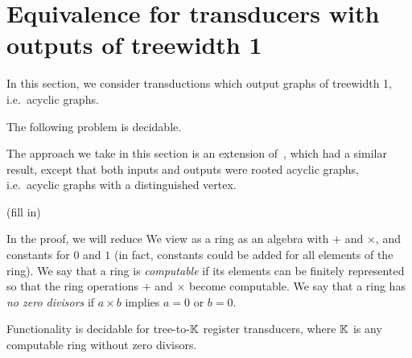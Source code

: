 
\section{Equivalence for transducers with outputs of treewidth 1}
In this section, we consider transductions which output graphs of treewidth 1, i.e.~acyclic graphs. 

\begin{theorem} The following problem is decidable.
\end{theorem}

The approach we take in this section is an extension of~\cite[Section 3.3]{boiretReducingTransducerEquivalence2018}, which had a similar result, except that both inputs and outputs were rooted acyclic graphs, i.e.~acyclic graphs with a distinguished vertex. 

\begin{center}
    (fill in)
\end{center}

In the proof, we will reduce 
We view as a ring as an algebra with $+$ and $\times$, and constants for $0$ and $1$ (in fact, constants could be added for all elements of the ring). We say that a ring is \emph{computable} if its elements can be finitely represented so that the ring operations $+$ and $\times$ become computable. We say that a ring has  \emph{no zero divisors} if $a \times b$ implies $a = 0$ or $b=0$.


\begin{theorem}\label{thm:equivalence-polynomial-automata-over-a-ring}
    Functionality is decidable for tree-to-$\mathbb K$ register transducers, where $\mathbb K$ is any computable ring without zero divisors. 
\end{theorem}